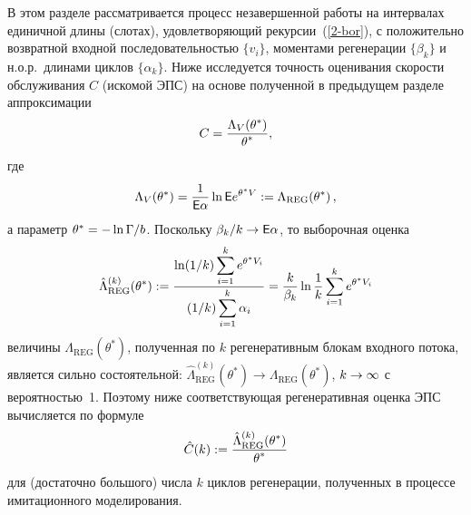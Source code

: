 \begin{multicols}{2}
В этом разделе рассматривается процесс незавершенной работы на
интервалах единичной длины  (слотах), удовлетворяющий рекурсии~(\ref{2-bor}), 
с положительно возвратной входной по\-сле\-до\-ва\-тель\-ностью
$\{v_i\}$, моментами регенерации $\{\beta_k\}$ и н.о.р.\ длинами
циклов $\{\alpha_k\}$. Ниже  исследуется точность оценивания
скорости обслуживания $C$ (искомой ЭПС)    на основе полученной в
предыдущем разделе аппроксимации
\begin{equation*}
C=\fr{\Lambda_V(\theta^*)}
{\theta^*},%
\end{equation*}
где
$$
\Lambda_V(\theta^*)=\displaystyle\frac{\displaystyle 1\mathstrut}{\displaystyle {\sf E} \alpha\mathstrut} \ln {\sf E} e^{\theta^*
V}:=\Lambda_{\mathrm{REG}}(\theta^*)\,,
$$
а параметр $\theta^*\hm=-\ln\Gamma/b$. Поскольку $\beta_k/k\hm\to \e
\alpha$, то выборочная оценка
\begin{equation*}
\hat \Lambda_{\mathrm{REG}}^{(k)} (\theta^*):=\displaystyle\frac{\displaystyle \ln
(1/k)\sum\limits_{i=1}^k e^{\theta^* V_i}\mathstrut}{\displaystyle (1/k)\sum\limits_{i=1}^k
\alpha_i\mathstrut}=  \displaystyle\frac{\displaystyle k\mathstrut}{\displaystyle \beta_k\mathstrut}
  \ln\displaystyle\frac{\displaystyle 1\mathstrut}{\displaystyle k\mathstrut} \sum\limits_{i=1}^{k} e^{\theta^*  V_i}
\end{equation*}
величины $\Lambda_{\mathrm{REG}}(\theta^*)$, полученная по $k$ регенеративным
блокам входного потока, является сильно состоятельной:
$
\hat \Lambda_{\mathrm{REG}}^{(k)} (\theta^*)\to
\Lambda_{\mathrm{REG}}(\theta^*)$, $k\hm\to \infty$ с вероятностью~1.
Поэтому ниже соответствующая регенеративная
оценка ЭПС вычисляется по формуле
\begin{equation}
\hat C(k):=\displaystyle\frac{\displaystyle \hat \Lambda_{\mathrm{REG}}^{(k)}(\theta^*)\mathstrut}{\displaystyle \theta^*\mathstrut}
\label{40-bor}
\end{equation}
для (достаточно большого) числа $k$ циклов регенерации, полученных в
процессе имитационного моделирования.



\end{multicols}
